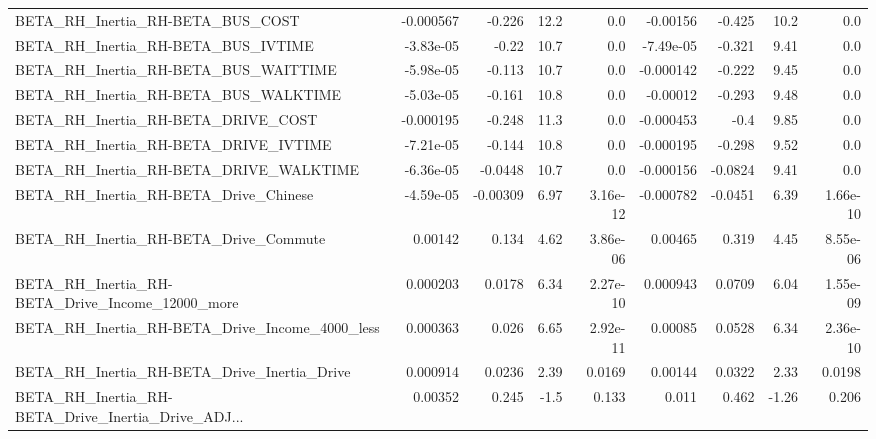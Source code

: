 \begin{tabular}{lrrrrrrrr}
BETA\_RH\_Inertia\_RH-BETA\_BUS\_COST                   &   -0.000567 &       -0.226 &     12.2 &      0.0 &   -0.00156 &      -0.425 &         10.2 &           0.0 \\
BETA\_RH\_Inertia\_RH-BETA\_BUS\_IVTIME                 &   -3.83e-05 &        -0.22 &     10.7 &      0.0 &  -7.49e-05 &      -0.321 &         9.41 &           0.0 \\
BETA\_RH\_Inertia\_RH-BETA\_BUS\_WAITTIME               &   -5.98e-05 &       -0.113 &     10.7 &      0.0 &  -0.000142 &      -0.222 &         9.45 &           0.0 \\
BETA\_RH\_Inertia\_RH-BETA\_BUS\_WALKTIME               &   -5.03e-05 &       -0.161 &     10.8 &      0.0 &   -0.00012 &      -0.293 &         9.48 &           0.0 \\
BETA\_RH\_Inertia\_RH-BETA\_DRIVE\_COST                 &   -0.000195 &       -0.248 &     11.3 &      0.0 &  -0.000453 &        -0.4 &         9.85 &           0.0 \\
BETA\_RH\_Inertia\_RH-BETA\_DRIVE\_IVTIME               &   -7.21e-05 &       -0.144 &     10.8 &      0.0 &  -0.000195 &      -0.298 &         9.52 &           0.0 \\
BETA\_RH\_Inertia\_RH-BETA\_DRIVE\_WALKTIME             &   -6.36e-05 &      -0.0448 &     10.7 &      0.0 &  -0.000156 &     -0.0824 &         9.41 &           0.0 \\
BETA\_RH\_Inertia\_RH-BETA\_Drive\_Chinese              &   -4.59e-05 &     -0.00309 &     6.97 & 3.16e-12 &  -0.000782 &     -0.0451 &         6.39 &      1.66e-10 \\
BETA\_RH\_Inertia\_RH-BETA\_Drive\_Commute              &     0.00142 &        0.134 &     4.62 & 3.86e-06 &    0.00465 &       0.319 &         4.45 &      8.55e-06 \\
BETA\_RH\_Inertia\_RH-BETA\_Drive\_Income\_12000\_more    &    0.000203 &       0.0178 &     6.34 & 2.27e-10 &   0.000943 &      0.0709 &         6.04 &      1.55e-09 \\
BETA\_RH\_Inertia\_RH-BETA\_Drive\_Income\_4000\_less     &    0.000363 &        0.026 &     6.65 & 2.92e-11 &    0.00085 &      0.0528 &         6.34 &      2.36e-10 \\
BETA\_RH\_Inertia\_RH-BETA\_Drive\_Inertia\_Drive        &    0.000914 &       0.0236 &     2.39 &   0.0169 &    0.00144 &      0.0322 &         2.33 &        0.0198 \\
BETA\_RH\_Inertia\_RH-BETA\_Drive\_Inertia\_Drive\_ADJ... &     0.00352 &        0.245 &     -1.5 &    0.133 &      0.011 &       0.462 &        -1.26 &         0.206 \\

\end{tabular}
